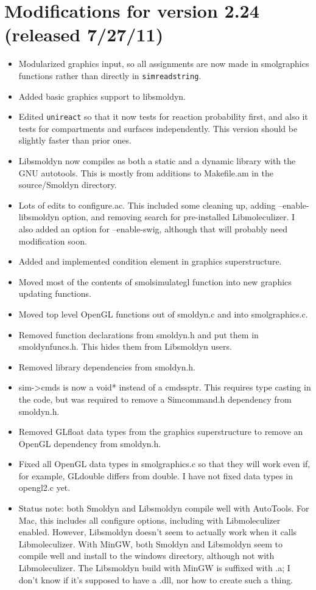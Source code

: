 \documentclass {scrbook}
\newcommand {\ttt} {\texttt}
\begin{document}
\section{Modifications for version 2.24 (released 7/27/11)}
\begin{itemize}
\item Modularized graphics input, so all assignments are now made in smolgraphics functions rather than directly in \ttt{simreadstring}.
\item Added basic graphics support to libsmoldyn.
\item Edited \ttt{unireact} so that it now tests for reaction probability first, and also it tests for compartments and surfaces independently. This version should be slightly faster than prior ones.
\item Libsmoldyn now compiles as both a static and a dynamic library with the GNU autotools. This is mostly from additions to Makefile.am in the source/Smoldyn directory.
\item Lots of edits to configure.ac. This included some cleaning up, adding --enable-libsmoldyn option, and removing search for pre-installed Libmoleculizer. I also added an option for --enable-swig, although that will probably need modification soon.
\item Added and implemented condition element in graphics superstructure.
\item Moved most of the contents of smolsimulategl function into new graphics updating functions.
\item Moved top level OpenGL functions out of smoldyn.c and into smolgraphics.c.
\item Removed function declarations from smoldyn.h and put them in smoldynfuncs.h. This hides them from Libsmoldyn users.
\item Removed library dependencies from smoldyn.h.
\item sim->cmds is now a void* instead of a cmdssptr. This requires type casting in the code, but was required to remove a Simcommand.h dependency from smoldyn.h.
\item Removed GLfloat data types from the graphics superstructure to remove an OpenGL dependency from smoldyn.h.
\item Fixed all OpenGL data types in smolgraphics.c so that they will work even if, for example, GLdouble differs from double. I have not fixed data types in opengl2.c yet.
\item Status note: both Smoldyn and Libsmoldyn compile well with AutoTools. For Mac, this includes all configure options, including with Libmoleculizer enabled. However, Libsmoldyn doesn't seem to actually work when it calls Libmoleculizer. With MinGW, both Smoldyn and Libsmoldyn seem to compile well and install to the windows directory, although not with Libmoleculizer. The Libsmoldyn build with MinGW is suffixed with .a; I don't know if it's supposed to have a .dll, nor how to create such a thing.

\end{itemize}
\end{document}
